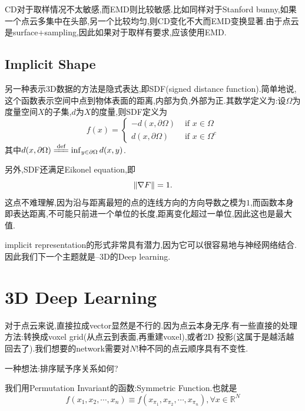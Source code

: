 	CD对于取样情况不太敏感,而EMD则比较敏感.比如同样对于Stanford bunny,如果一个点云多集中在头部,另一个比较均匀,则CD变化不大而EMD变换显著.由于点云是surface+sampling,因此如果对于取样有要求,应该使用EMD.
	
	\subsection{Implicit Shape}
	另一种表示3D数据的方法是隐式表达,即SDF(signed distance function).简单地说,这个函数表示空间中点到物体表面的距离,内部为负,外部为正.其数学定义为:设$\Omega$为度量空间$X$的子集,$d$为$X$的度量,则SDF定义为
	\begin{equation}
		f(x)=\begin{cases}
			-d(x, \partial \Omega) & \text { if } x \in \Omega 
			\\
			d(x, \partial \Omega) & \text { if } x \in \Omega^{c}
		\end{cases}
	\end{equation}
	其中$d(x, \partial \Omega) \xlongequal{\text{def}} \inf_{y \in \partial \Omega} d(x, y)$.
	
	另外,SDF还满足Eikonel equation,即
	\begin{equation}
		\left \Vert \nabla F \right \Vert = 1.
	\end{equation}
	这点不难理解,因为沿与距离最短的点的连线方向的方向导数之模为$1$,而函数本身即表达距离,不可能只前进一个单位的长度,距离变化超过一单位,因此这也是最大值.

	implicit representation的形式非常具有潜力,因为它可以很容易地与神经网络结合.因此我们下一个主题就是--3D的Deep learning.
	
	\clearpage
	\section{3D Deep Learning}
	对于点云来说,直接拉成vector显然是不行的.因为点云本身无序.有一些直接的处理方法:转换成voxel grid(从点云到表面,再重建voxel),或者2D 投影(这属于是越活越回去了).我们想要的network需要对$N!$种不同的点云顺序具有不变性.
	
	一种想法:排序赋予序关系如何?
	
	我们用Permutation Invariant的函数:Symmetric Function.也就是
	\begin{equation}
		f(x_1, x_2, \cdots, x_n) \equiv f(x_{\pi_1}, x_{\pi_2}, \cdots, x_{\pi_n}), \forall x \in \mathbb R^N
	\end{equation}

